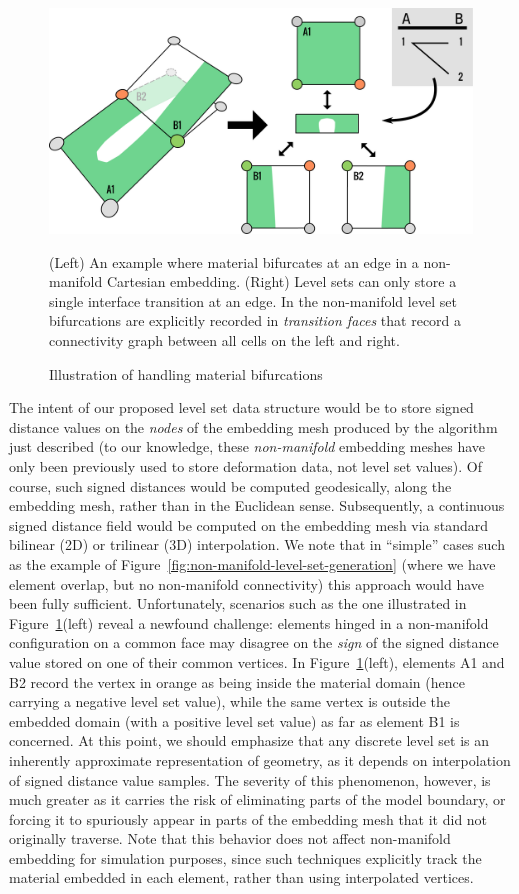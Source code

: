 \begin{figure}
  \centering
  \includegraphics[width=.8\columnwidth]{chapter_nonmanifoldlevelsets/images/TransitionFaceNew2.pdf}
  \caption{Illustration of handling material bifurcations}{(Left) An example where material bifurcates at an edge in a
    non-manifold Cartesian embedding. (Right) Level sets can only
    store a single interface transition at an edge. In the
    non-manifold level set bifurcations are explicitly recorded in
    \emph{transition faces} that record a connectivity graph between all cells on
    the left and right.}
  \label{fig:transition-face}
\end{figure}

The intent of our proposed level set data structure would be to store
signed distance values on the \emph{nodes} of the embedding mesh
produced by the algorithm just described (to our knowledge, these
\emph{non-manifold} embedding meshes have only been previously used to
store deformation data, not level set values). Of course, such signed
distances would be computed geodesically, along the embedding mesh,
rather than in the Euclidean sense. Subsequently, a continuous signed
distance field would be computed on the embedding mesh via standard
bilinear (2D) or trilinear (3D) interpolation. We note that in
``simple'' cases such as the example of
Figure~\ref{fig:non-manifold-level-set-generation} (where we have
element overlap, but no non-manifold connectivity) this approach would
have been fully sufficient. Unfortunately, scenarios such as the one
illustrated in Figure~\ref{fig:transition-face}(left) reveal a
newfound challenge: elements hinged in a non-manifold configuration on
a common face may disagree on the \emph{sign} of the signed distance
value stored on one of their common vertices. In
Figure~\ref{fig:transition-face}(left), elements \textsf{A1} and
\textsf{B2} record the vertex in orange as being inside the material
domain (hence carrying a negative level set value), while the same
vertex is outside the embedded domain (with a positive level set
value) as far as element \textsf{B1} is concerned. At this point, we
should emphasize that any discrete level set is an inherently
approximate representation of geometry, as it depends on interpolation
of signed distance value samples. The severity of this phenomenon,
however, is much greater as it carries the risk of eliminating parts
of the model boundary, or forcing it to spuriously appear in parts of
the embedding mesh that it did not originally traverse.  Note that
this behavior does not affect non-manifold embedding for simulation
purposes, since such techniques explicitly track the material embedded
in each element, rather than using interpolated vertices. 

